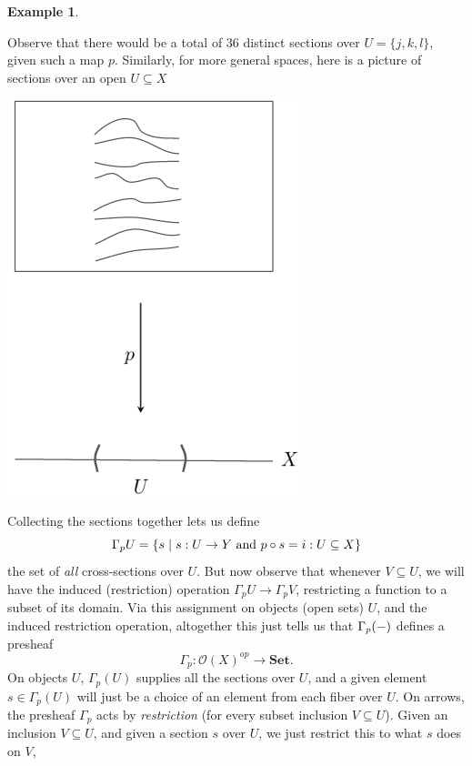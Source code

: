 \documentclass[11pt]{book}
\theoremstyle{definition}
\newtheorem{example}{Example}[section]
\theoremstyle{definition}
\theoremstyle{definition}
\theoremstyle{theorem}
\theoremstyle{definition}
\begin{document}
\begin{example}
\begin{center}
\end{center}
Observe that there would be a total of 36 distinct sections over $U = \{j,k,l\}$, given such a map $p$. Similarly, for more general spaces, here is a picture of sections over an open $U \subseteq  X$
\begin{center}
	\includegraphics*[scale=0.25]{FunctionSections.png}
\end{center} 
Collecting the sections together lets us define 
	\begin{equation}
	\Gamma_p U = \{s \hspace*{0.3em}| \hspace*{0.3em} s: U \rightarrow Y \text{ and } p \circ s = i: U \subseteq X\}
	\end{equation}
	the set of \textit{all} cross-sections over $U$. But now observe that whenever $V \subseteq  U$, we will have the induced (restriction) operation $\Gamma_p U \rightarrow \Gamma_p V$, restricting a function to a subset of its domain. Via this assignment on objects (open sets) $U$, and the induced restriction operation, altogether this just tells us that $\Gamma_p (\--)$ defines a presheaf 
	\begin{equation*} 
	\Gamma_p: \mathscr{O}(X)^{op} \rightarrow \textbf{Set}. 
	\end{equation*}
	On objects $U$, $\Gamma_p(U)$ supplies all the sections over $U$, and a given element $s \in \Gamma_p(U)$ will just be a choice of an element from each fiber over $U$. On arrows, the presheaf $\Gamma_p$ acts by \textit{restriction} (for every subset inclusion $V \subseteq  U$). Given an inclusion $V \subseteq  U$, and given a section $s$ over $U$, we just restrict this to what $s$ does on $V$, 

\end{example}
\end{document}
